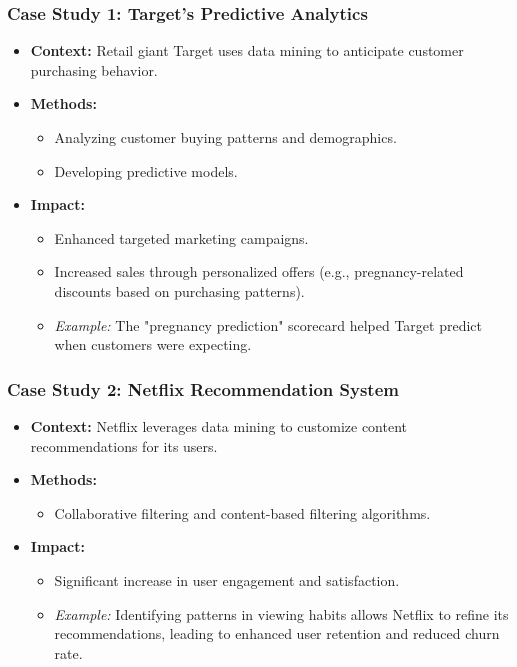 \documentclass[aspectratio=169]{beamer}
\begin{document}
\begin{frame}[fragile]
    \frametitle{Case Study 1: Target's Predictive Analytics}
    \begin{itemize}
        \item \textbf{Context:} Retail giant Target uses data mining to anticipate customer purchasing behavior.
        \item \textbf{Methods:} 
            \begin{itemize}
                \item Analyzing customer buying patterns and demographics.
                \item Developing predictive models.
            \end{itemize}
        \item \textbf{Impact:}
            \begin{itemize}
                \item Enhanced targeted marketing campaigns. 
                \item Increased sales through personalized offers (e.g., pregnancy-related discounts based on purchasing patterns).
                \item \textit{Example:} The "pregnancy prediction" scorecard helped Target predict when customers were expecting.
            \end{itemize}
    \end{itemize}
\end{frame}

\begin{frame}[fragile]
    \frametitle{Case Study 2: Netflix Recommendation System}
    \begin{itemize}
        \item \textbf{Context:} Netflix leverages data mining to customize content recommendations for its users.
        \item \textbf{Methods:} 
            \begin{itemize}
                \item Collaborative filtering and content-based filtering algorithms.
            \end{itemize}
        \item \textbf{Impact:}
            \begin{itemize}
                \item Significant increase in user engagement and satisfaction.
                \item \textit{Example:} Identifying patterns in viewing habits allows Netflix to refine its recommendations, leading to enhanced user retention and reduced churn rate.
            \end{itemize}
    \end{itemize}
\end{frame}
\end{document}
